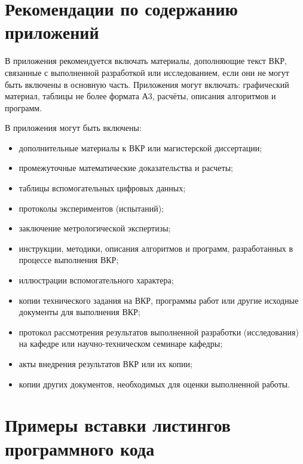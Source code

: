 \chapter{Рекомендации по содержанию приложений}\label{app:A}

В приложения рекомендуется включать материалы, дополняющие текст ВКР, связанные с выполненной разработкой или исследованием, если они не могут быть включены в основную часть. Приложения могут включать: графический материал, таблицы не более формата А3, расчёты, описания алгоритмов и программ.

В приложения могут быть включены:
\begin{itemize}
  \item дополнительные материалы к ВКР или магистерской диссертации;
  \item промежуточные математические доказательства и расчеты;
  \item таблицы вспомогательных цифровых данных;
  \item протоколы экспериментов (испытаний);
  \item заключение метрологической экспертизы;
  \item инструкции, методики, описания алгоритмов и программ, разработанных в процессе выполнения ВКР;
  \item иллюстрации вспомогательного характера;
  \item копии технического задания на ВКР, программы работ или другие исходные документы для выполнения ВКР;
  \item протокол рассмотрения результатов выполненной разработки (исследования) на кафедре или научно-техническом семинаре кафедры;
  \item акты внедрения результатов ВКР или их копии;
  \item копии других документов, необходимых для оценки выполненной работы.
\end{itemize}



\chapter{Примеры вставки листингов программного кода}\label{app:B}

